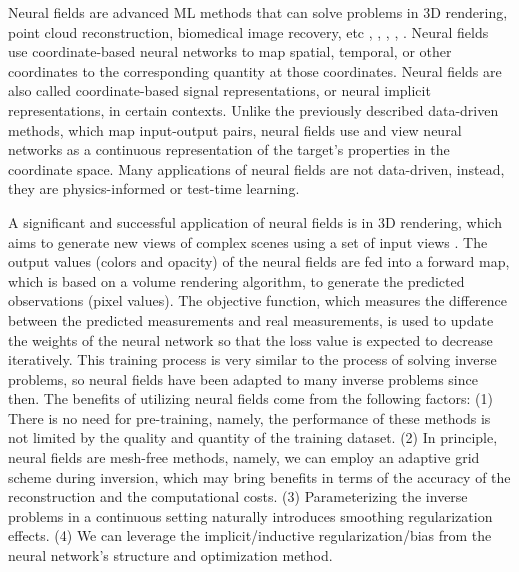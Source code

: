 \documentclass[lettersize,journal]{IEEEtran}
\begin{document}

Neural fields are advanced ML methods that can solve problems in 3D rendering, point cloud reconstruction, biomedical image recovery, etc \cite{https://doi.org/10.1111/cgf.14505}, \cite{10.1145/3503250}, \cite{9709943}, \cite{9606601}, \cite{Cachia_2023}. Neural fields use coordinate-based neural networks to map spatial, temporal, or other coordinates to the corresponding quantity at those coordinates. Neural fields are also called coordinate-based signal representations, or neural implicit representations, in certain contexts. Unlike the previously described data-driven methods, which map input-output pairs, neural fields use and view neural networks as a continuous representation of the target's properties in the coordinate space. Many applications of neural fields are not data-driven, instead, they are physics-informed or test-time learning. 

A significant and successful application of neural fields is in 3D rendering, which aims to generate new views of complex scenes using a set of input views \cite{10.1145/3503250}. The output values (colors and opacity) of the neural fields are fed into a forward map, which is based on a volume rendering algorithm, to generate the predicted observations (pixel values). The objective function, which measures the difference between the predicted measurements and real measurements, is used to update the weights of the neural network so that the loss value is expected to decrease iteratively. This training process is very similar to the process of solving inverse problems, so neural fields have been adapted to many inverse problems since then. The benefits of utilizing neural fields come from the following factors: (1) There is no need for pre-training, namely, the performance of these methods is not limited by the quality and quantity of the training dataset. (2) In principle, neural fields are mesh-free methods, namely, we can employ an adaptive grid scheme during inversion, which may bring benefits in terms of the accuracy of the reconstruction and the computational costs. (3) Parameterizing the inverse problems in a continuous setting naturally introduces smoothing regularization effects. (4) We can leverage the implicit/inductive regularization/bias from the neural network's structure and optimization method.
\end{document}
